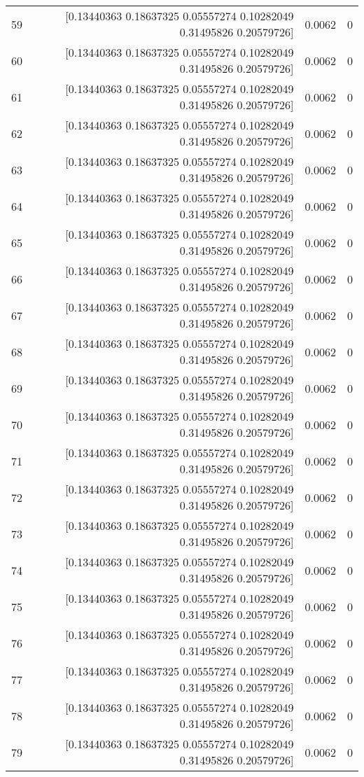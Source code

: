 \begin{longtable}{lrrr}
59 & [0.13440363 0.18637325 0.05557274 0.10282049 0.31495826 0.20579726] & 0.0062 & 0 \\
60 & [0.13440363 0.18637325 0.05557274 0.10282049 0.31495826 0.20579726] & 0.0062 & 0 \\
61 & [0.13440363 0.18637325 0.05557274 0.10282049 0.31495826 0.20579726] & 0.0062 & 0 \\
62 & [0.13440363 0.18637325 0.05557274 0.10282049 0.31495826 0.20579726] & 0.0062 & 0 \\
63 & [0.13440363 0.18637325 0.05557274 0.10282049 0.31495826 0.20579726] & 0.0062 & 0 \\
64 & [0.13440363 0.18637325 0.05557274 0.10282049 0.31495826 0.20579726] & 0.0062 & 0 \\
65 & [0.13440363 0.18637325 0.05557274 0.10282049 0.31495826 0.20579726] & 0.0062 & 0 \\
66 & [0.13440363 0.18637325 0.05557274 0.10282049 0.31495826 0.20579726] & 0.0062 & 0 \\
67 & [0.13440363 0.18637325 0.05557274 0.10282049 0.31495826 0.20579726] & 0.0062 & 0 \\
68 & [0.13440363 0.18637325 0.05557274 0.10282049 0.31495826 0.20579726] & 0.0062 & 0 \\
69 & [0.13440363 0.18637325 0.05557274 0.10282049 0.31495826 0.20579726] & 0.0062 & 0 \\
70 & [0.13440363 0.18637325 0.05557274 0.10282049 0.31495826 0.20579726] & 0.0062 & 0 \\
71 & [0.13440363 0.18637325 0.05557274 0.10282049 0.31495826 0.20579726] & 0.0062 & 0 \\
72 & [0.13440363 0.18637325 0.05557274 0.10282049 0.31495826 0.20579726] & 0.0062 & 0 \\
73 & [0.13440363 0.18637325 0.05557274 0.10282049 0.31495826 0.20579726] & 0.0062 & 0 \\
74 & [0.13440363 0.18637325 0.05557274 0.10282049 0.31495826 0.20579726] & 0.0062 & 0 \\
75 & [0.13440363 0.18637325 0.05557274 0.10282049 0.31495826 0.20579726] & 0.0062 & 0 \\
76 & [0.13440363 0.18637325 0.05557274 0.10282049 0.31495826 0.20579726] & 0.0062 & 0 \\
77 & [0.13440363 0.18637325 0.05557274 0.10282049 0.31495826 0.20579726] & 0.0062 & 0 \\
78 & [0.13440363 0.18637325 0.05557274 0.10282049 0.31495826 0.20579726] & 0.0062 & 0 \\
79 & [0.13440363 0.18637325 0.05557274 0.10282049 0.31495826 0.20579726] & 0.0062 & 0 \\

\end{longtable}
